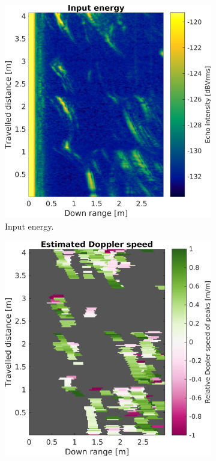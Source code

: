 \begin{figure}[htbp]
    \centering
    \begin{subfigure}[t]{.3\textwidth}
        \includegraphics[max width=\linewidth]{gfx/figures/t_input.png}
        \caption{Input energy.}
        \label{fig:pres3-i}
    \end{subfigure}%
    \hfill%
    \begin{subfigure}[t]{.3\textwidth}
        \includegraphics[max width=\linewidth]{gfx/figures/t_doppler.png}

\end{subfigure}
\end{figure}
